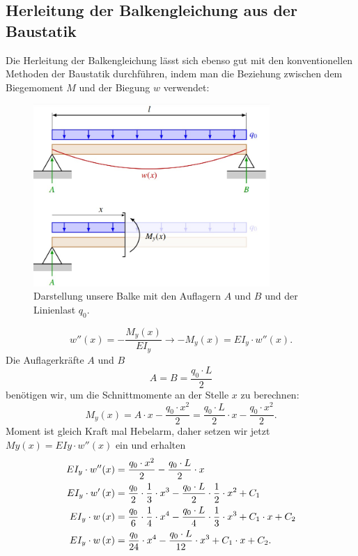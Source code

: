 \subsection{Herleitung der Balkengleichung aus der Baustatik}
Die Herleitung der Balkengleichung lässt sich ebenso gut mit den konventionellen Methoden der Baustatik durchführen, indem man die Beziehung zwischen dem Biegemoment $M$ und der Biegung $w$ verwendet:
%
\begin{figure}
\begin{center}
	\includegraphics[width=0.8\textwidth]{papers/balken/images/teil2/HerleitungBaustatik.jpg}
\end{center}
\caption{Darstellung unsere Balke mit den Auflagern $A$ und $B$ und der Linienlast $q_0$.}
\end{figure}
\begin{equation*}
	w''(x)=
	-\frac{M_y(x)}{EI_y}
	\rightarrow-M_y(x)=
	EI_y\cdot w''(x).
\end{equation*}
Die Auflagerkräfte $A$ und $B$
\begin{equation*}
	A=
	B=
	\frac{q_0\cdot L}{2}
\end{equation*}
benötigen wir, um die Schnittmomente an der Stelle $x$ zu berechnen:
\begin{equation*}
	M_y(x)=
	A\cdot x-\frac{q_0\cdot x^2}{2}=
	\frac{q_0\cdot L}{2}\cdot x-\frac{q_0\cdot x^2}{2}.
\end{equation*}
Moment ist gleich Kraft mal Hebelarm, daher setzen wir jetzt $My(x) = EIy \cdot w''(x)$ ein und erhalten
\begin{align}
		EI_y\cdot w''(x)&=
		\frac{q_0\cdot x^2}{2}-\frac{q_0\cdot L}{2}\cdot x
\notag
	\\
		EI_y\cdot w'\left(x\right)&=
		\frac{q_0}{2}\cdot\frac{1}{3}\cdot x^3-\frac{q_0\cdot 	L}{2}\cdot\frac{1}{2}\cdot x^2+C_1
\notag
	\\
		EI_y\cdot w\left(x\right)&=
		\frac{q_0}{6}\cdot\frac{1}{4}\cdot x^4-\frac{q_0\cdot 	L}{4}\cdot\frac{1}{3}\cdot x^3+C_1\cdot x+C_2
\notag
	\\
		EI_y\cdot w\left(x\right)&=
		\frac{q_0}{24}\cdot x^4-\frac{q_0\cdot L}{12}\cdot x^3+C_1\cdot x+C_2.
\label{balken:l73}
\end{align}

